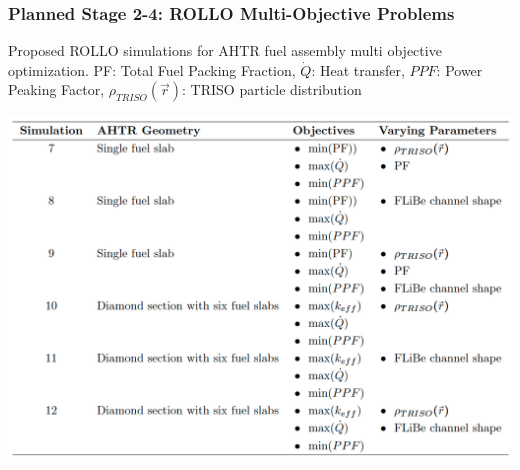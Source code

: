 \begin{frame}
    \frametitle{Planned Stage 2-4: ROLLO Multi-Objective Problems}
    \begin{table}
        \caption{Proposed ROLLO simulations for AHTR fuel assembly multi 
        objective optimization.
        PF: Total Fuel Packing Fraction, $\dot{Q}$: Heat transfer, $PPF$: Power Peaking Factor, 
        $\rho_{TRISO}(\vec{r})$: \gls{TRISO} particle distribution}
        \includegraphics[width=0.7\linewidth]{figures/multi-obj.png}
    \end{table}
\end{frame}